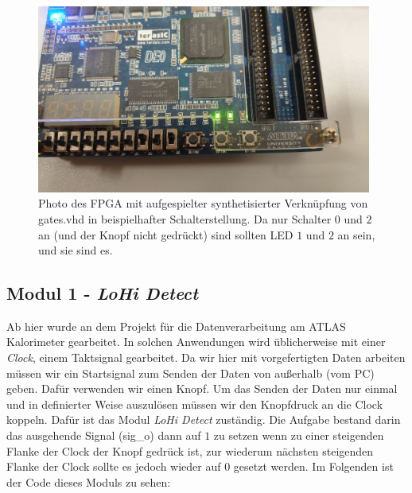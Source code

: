 \begin{figure}[ht]
	\centering
    \includegraphics[width=0.98\textwidth]{../Daten/Photo_FPGA_gates.png}
	\caption{Photo des FPGA mit aufgespielter synthetisierter Verknüpfung von gates.vhd in beispielhafter Schalterstellung. Da nur Schalter $0$ und $2$ an (und der Knopf nicht gedrückt) sind sollten LED $1$ und $2$ an sein, und sie sind es.}
	\label{photo_gates}
\end{figure}

\subsection{Modul 1 - \textit{LoHi Detect}}

Ab hier wurde an dem Projekt für die Datenverarbeitung am ATLAS Kalorimeter gearbeitet.
In solchen Anwendungen wird üblicherweise mit einer \textit{Clock}, einem Taktsignal gearbeitet.
Da wir hier mit vorgefertigten Daten arbeiten müssen wir ein Startsignal zum Senden der Daten von außerhalb (vom PC) geben.
Dafür verwenden wir einen Knopf.
Um das Senden der Daten nur einmal und in definierter Weise auszulösen müssen wir den Knopfdruck an die Clock koppeln.
Dafür ist das Modul \textit{LoHi Detect} zuständig.
Die Aufgabe bestand darin das ausgehende Signal (sig\_o) dann auf $1$ zu setzen wenn zu einer steigenden Flanke der Clock der Knopf gedrück ist, zur wiederum nächsten steigenden Flanke der Clock sollte es jedoch wieder auf $0$ gesetzt werden.
Im Folgenden ist der Code dieses Moduls zu sehen:



